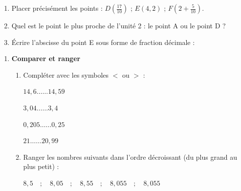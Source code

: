 \documentclass[a4paper]{book}
\begin{document}
{\begin{exercice}
\begin{enumerate}[leftmargin=*]
            L'abscisse du point $A$ est : \dotfill \quad \quad
            L'abscisse du point $B$ est : \dotfill \quad \quad
            L'abscisse du point $C$ est : \dotfill

            \medskip
    
            \item Placer précisément les points : $D(\frac{17}{10})$ ; $E(4,2)$ ; $F(2 + \frac{5}{10})$.

            \medskip
    
            \item Quel est le point le plus proche de l'unité 2 : le point A ou le point D ? \dotfill

            \medskip
            
            \item Écrire l'abscisse du point E sous forme de fraction décimale : \dotfill
        \end{enumerate}   
    \end{exercice}
    

    \begin{exercice}
        \begin{enumerate}[leftmargin=*]
            \item \textbf{Comparer et ranger}

            \begin{enumerate}[leftmargin=*]
                \item Compléter avec les symboles $<$ ou $>$ :
                
                    \begin{minipage}{0.45\linewidth}
                        $14,6 \dots\dots 14,59$

                        \medskip
                        
                        $3,04 \dots\dots 3,4$
                    \end{minipage}
                    \hfill \vline \hfill
                    \begin{minipage}{0.45\linewidth}
                        $0,205 \dots\dots 0,25$

                        \medskip
                        
                        $21 \dots\dots 20,99$
                    \end{minipage}

                \medskip

                \item Ranger les nombres suivants dans l'ordre décroissant (du plus grand au plus petit) :
                \begin{center}
                    $8,5 \quad ; \quad 8,05 \quad ; \quad 8,55 \quad ; \quad 8,055 \quad ; \quad 8,055$
                \end{center}
                

\end{enumerate}
\end{enumerate}
\end{exercice}}
\end{document}
